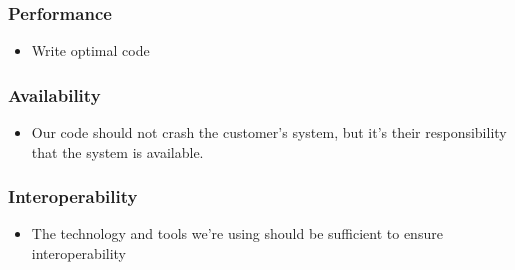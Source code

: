 \subsubsection{Performance}
\begin{itemize}
\item Write optimal code
\end{itemize}

\subsubsection{Availability}
\begin{itemize}
\item Our code should not crash the customer's system, but it's their responsibility that the system is available.
\end{itemize}

\subsubsection{Interoperability}
\begin{itemize}
\item The technology and tools we're using should be sufficient to ensure interoperability
\end{itemize}